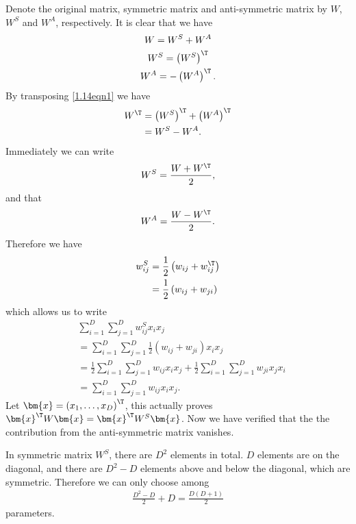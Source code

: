 \begin{answer}{}
	Denote the original matrix, symmetric matrix and anti-symmetric matrix by $W$, $W^S$ and $W^A$, respectively. It is clear that we have
	\begin{gather}
		W = W^S + W^A\\ \label{1.14eqn1}
		W^S = \left(W^S\right)^{\T}\\
		W^A = -\left(W^A\right)^{\T}.
	\end{gather}
	By transposing \ref{1.14eqn1} we have
	\begin{align}
		W^{\T} &= \left(W^S\right)^{\T} + \left(W^A\right)^{\T}\\
		&= W^S - W^A.
	\end{align}
	Immediately we can write
	\begin{align}
		W^S = \frac{W + W^{\T}}{2},
	\end{align}
	and that
	\begin{align}
		W^A = \frac{W - W^{\T}}{2}.
	\end{align}
	Therefore we have
	\begin{align}
		w^S_{ij} &= \frac{1}{2}\left(w_{ij} + w^{\T}_{ij}\right)\\
		&= \frac{1}{2}\left(w_{ij} + w_{ji}\right)
	\end{align}
	which allows us to write
	\begin{align}
		&\sum_{i = 1}^{D} \sum_{j = 1}^{D} w_{ij}^{S} x_i x_j\\
		&= \sum_{i = 1}^{D} \sum_{j = 1}^{D} \frac{1}{2}\left(w_{ij} + w_{ji}\right) x_i x_j\\
		&= \frac{1}{2}\sum_{i = 1}^{D} \sum_{j = 1}^{D} w_{ij}x_ix_j + \frac{1}{2}\sum_{i = 1}^{D} \sum_{j = 1}^{D} w_{ji}x_jx_i\\
		&= \sum_{i = 1}^{D} \sum_{j = 1}^{D} w_{ij}x_ix_j.
	\end{align}
	Let $\bm{x} = \left(x_1, \ldots, x_D\right)^{\T}$, this actually proves $\bm{x}^{\T}W\bm{x} = \bm{x}^{\T}W^S\bm{x}$. Now we have verified that the the contribution from the anti-symmetric matrix vanishes.
	
	In symmetric matrix $W^S$, there are $D^2$ elements in total. $D$ elements are on the diagonal, and there are $D^2 - D$ elements above and below the diagonal, which are symmetric. Therefore we can only choose among
	\begin{align}
		\frac{D^2 - D}{2} + D = \frac{D(D+1)}{2}
	\end{align}
	parameters.
\end{answer}